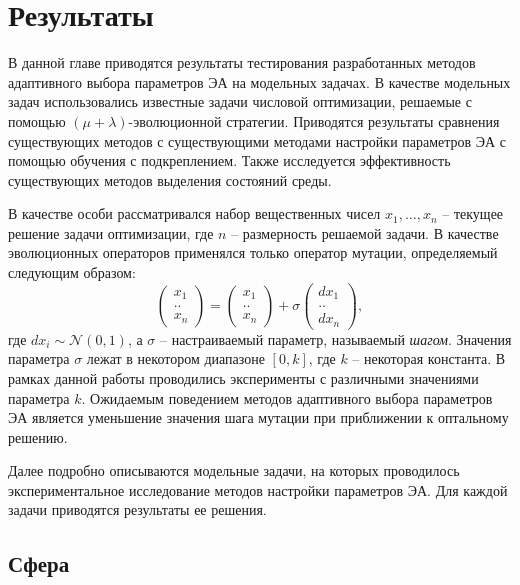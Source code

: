 \chapter{Результаты}
\label{chapter_results}

В данной главе приводятся результаты тестирования разработанных методов адаптивного выбора параметров ЭА на модельных задачах. В качестве модельных задач использовались известные задачи числовой оптимизации, решаемые с помощью $(\mu + \lambda)$-эволюционной стратегии. Приводятся результаты сравнения существующих методов с существующими методами настройки параметров ЭА с помощью обучения с подкреплением. Также исследуется эффективность существующих методов выделения состояний среды.

В качестве особи рассматривался набор вещественных чисел $x_1, \ldots, x_n$ -- текущее решение задачи оптимизации, где $n$ -- размерность решаемой задачи. В качестве эволюционных операторов применялся только оператор мутации, определяемый следующим образом:
\begin{equation}
 \begin{pmatrix} x_1 \\ .. \\ x_n \end{pmatrix} = \begin{pmatrix} x_1 \\ .. \\ x_n \end{pmatrix} + \sigma \begin{pmatrix}dx_1 \\ .. \\ dx_n\end{pmatrix}, 
\end{equation}
где $dx_i \sim \mathcal{N}(0, 1)$, а $\sigma$ -- настраиваемый параметр, называемый \textit{шагом}. Значения параметра $\sigma$ лежат в некотором диапазоне $[0, k]$, где $k$ -- некоторая константа. В рамках данной работы проводились эксперименты с различными значениями параметра $k$. Ожидаемым поведением методов адаптивного выбора параметров ЭА является уменьшение значения шага мутации при приближении к оптальному решению. 

Далее подробно описываются модельные задачи, на которых проводилось экспериментальное исследование методов настройки параметров ЭА. Для каждой задачи приводятся результаты ее решения. 
 
\section{Сфера}

